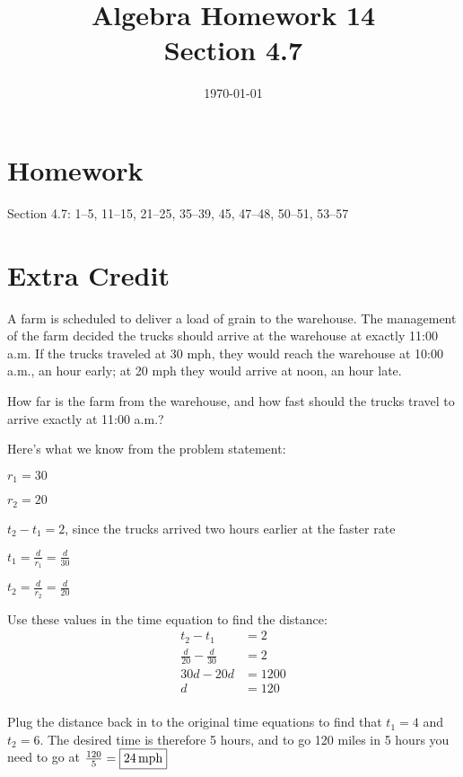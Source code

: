 \documentclass[letterpaper, landscape]{exam}
\title{Algebra Homework 14 \\ Section 4.7}
\author{}
\date{\today}
\begin{document}
  \maketitle

  \section{Homework}
  Section 4.7: 1--5, 11--15, 21--25, 35--39, 45, 47--48, 50--51, 53--57

  \section{Extra Credit}

  A farm is scheduled to deliver a load of grain to the warehouse.  The
  management of the farm decided the trucks should arrive at the warehouse at
  exactly 11:00 a.m.  If the trucks traveled at 30 mph, they would reach the
  warehouse at 10:00 a.m., an hour early; at 20 mph they would arrive at noon,
  an hour late.

  How far is the farm from the warehouse, and how fast should the trucks travel
  to arrive exactly at 11:00 a.m.?

  \begin{solution}

    Here's what we know from the problem statement:
    \begin{itemize*}
      \item $r_1 = 30$
      \item $r_2 = 20$
      \item $t_2 - t_1 = 2$, since the trucks arrived two hours earlier at the faster rate
    \end{itemize*}

    \begin{itemize*}
      \item $t_1 = \frac{d}{r_1} = \frac{d}{30}$
      \item $t_2 = \frac{d}{r_2} = \frac{d}{20}$
    \end{itemize*}

    Use these values in the time equation to find the distance:
    \begin{align*}
      t_2 - t_1                   & = 2 \\
      \frac{d}{20} - \frac{d}{30} & = 2 \\
      30d - 20d                   & = 1200 \\
      d                           & = 120 \\
    \end{align*}

    Plug the distance back in to the original time equations to find that $t_1
    = 4$ and $t_2 = 6$.  The desired time is therefore 5 hours, and to go 120
    miles in 5 hours you need to go at $\frac{120}{5} = \boxed{ \unit[24]{mph}
  }$

  \end{solution}
\end{document}
